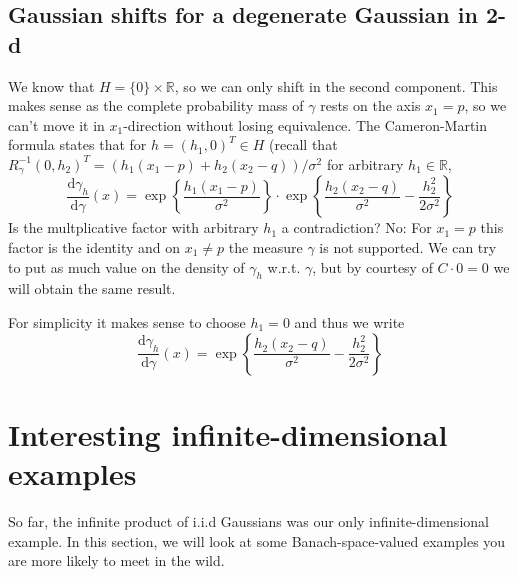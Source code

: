 \documentclass{scrartcl}
\theoremstyle{definition}
\theoremstyle{remark}
\newcommand{\de}{\mathrm d}
\newcommand{\R}{\mathbb R}
\DeclareRobustCommand{\myboxtwo}[2][blue!20]{%
\begin{tcolorbox}[   %
        breakable,
        left=0pt,
        right=0pt,
        top=0pt,
        bottom=0pt,
        colback=#1,
        colframe=#1,
        width=\dimexpr\textwidth\relax, 
        enlarge left by=0mm,
        boxsep=5pt,
        arc=10pt,outer arc=10pt,
        ]
        #2
\end{tcolorbox}
}
\begin{document}
\myboxtwo{\subsection*{Gaussian shifts for a degenerate Gaussian in 2-d}
We know that $H = \{0\}\times \R$, so we can only shift in the second component. This makes sense as the complete probability mass of $\gamma$ rests on the axis $x_1=p$, so we can't move it in $x_1$-direction without losing equivalence. The Cameron-Martin formula states that for $h = (h_1,0)^T \in H$ (recall that $R_\gamma^{-1} (0,h_2)^T = (h_1(x_1-p)+h_2(x_2-q))/\sigma^2$ for arbitrary $h_1\in\R$, 
\[ \frac{\de \gamma_h}{\de \gamma}(x) = \exp\left\{\frac{h_1(x_1-p)}{\sigma^2}\right\}\cdot \exp\left\{\frac{h_2(x_2-q)}{\sigma^2} - \frac{h_2^2}{2\sigma^2} \right\} \]
Is the multplicative factor with arbitrary $h_1$ a contradiction? No: For $x_1 = p$ this factor is the identity and on $x_1 \neq p$ the measure $\gamma$ is not supported. We can try to put as much value on the density of $\gamma_h$ w.r.t. $\gamma$, but by courtesy of $C\cdot 0 = 0$ we will obtain the same result.

For simplicity it makes sense to choose $h_1=0$ and thus we write
\[ \frac{\de \gamma_h}{\de \gamma}(x) = \exp\left\{\frac{h_2(x_2-q)}{\sigma^2} - \frac{h_2^2}{2\sigma^2} \right\} \]
}
\section{Interesting infinite-dimensional examples}
So far, the infinite product of i.i.d Gaussians was our only infinite-dimensional example. In this section, we will look at some Banach-space-valued examples you are more likely to meet in the wild.
\end{document}

